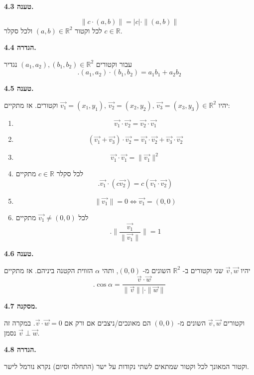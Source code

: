 \documentclass[12pt]{report}
\theoremstyle{plain}
\theoremstyle{definition}
\newcommand{\R}{\mathbb{R}}
\newcommand{\0}{\mathbf{0}}
\begin{document}
\noindent\textbf{טענה 4.3.}

$$
\|c\cdot(a,b)\|=|c|\cdot\|(a,b)\|
$$ 
לכל וקטור
$(a,b)\in\R^2$
ולכל סקלר $c\in\R$.
\bigskip
\bigskip

\noindent\textbf{הגדרה 4.4.}

עבור וקטורים
$(a_1,a_2),(b_1,b_2)\in\R^2$
נגדיר
$$
.(a_1,a_2)\cdot(b_1,b_2)=a_1b_1+a_2b_2
$$
\bigskip
\bigskip

\noindent\textbf{טענה 4.5.}

יהיו
$\vec{v_1}=(x_1,y_1),\,\vec{v_2}=(x_2,y_2),\,\vec{v_3}=(x_3,y_3)\in\R^2$
וקטורים. אז מתקיים:

\begin{enumerate}[label=\alph*.]
\item 
$$\vec{v_1}\cdot\vec{v_2}=\vec{v_2}\cdot\vec{v_1}$$


\item $$(\vec{v_1}+\vec{v_3})\cdot\vec{v_2}=\vec{v_1}\cdot\vec{v_2}+\vec{v_3}\cdot\vec{v_2}$$


\item 
$$\vec{v_1}\cdot\vec{v_1}=\|\vec{v_1}\|^2$$


\item 
לכל סקלר
$c\in\R$
מתקיים
$$.\vec{v_1}\cdot(c\vec{v_2})=c(\vec{v_1}\cdot\vec{v_2})$$


\item 
$$\|\vec{v_1}\|=0\iff\vec{v_1}=(0,0)$$


\item 
לכל
$\vec{v_1}\neq (0,0)$
מתקיים
$$.\|\frac{\vec{v_1}}{\|\vec{v_1}\|}\|=1$$


\end{enumerate}
\bigskip
\bigskip

\noindent\textbf{טענה 4.6.}

יהיו
$\vec{v},\vec{w}$
שני וקטורים ב-
$\R^2$
השונים מ-
$(0,0)$,
ותהי
$\alpha$
הזווית הקטנה ביניהם. אז מתקיים
\begin{equation}\label{eq:cosine-scalar}
	.\cos\alpha=\frac{\vec{v}\cdot\vec{w}}{\|\vec{v}\||\cdot\|\vec{w}\|}
\end{equation}
\bigskip
\bigskip

\noindent\textbf{מסקנה 4.7.}

וקטורים
$\vec{v},\vec{w}$
השונים מ-
$(0,0)$
הם מאונכים/ניצבים אם ורק אם
$\vec{v}\cdot\vec{w}=0$.
במקרה זה נסמן
$\vec{v}\perp\vec{w}$.
\bigskip
\bigskip

\noindent\textbf{הגדרה 4.8.}

וקטור המאונך לכל וקטור שמתאים לשתי נקודות על ישר (התחלה וסיום)
נקרא נורמל לישר.
\bigskip
\bigskip
\end{document}

